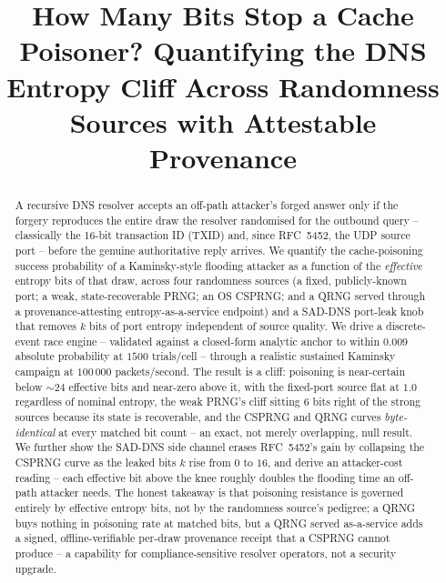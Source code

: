 \documentclass[conference]{IEEEtran}
\begin{document}
\title{How Many Bits Stop a Cache Poisoner? Quantifying the DNS Entropy Cliff Across Randomness Sources with Attestable Provenance}

\author{
}

\maketitle

\begin{abstract}
A recursive DNS resolver accepts an off-path attacker's forged answer only if the forgery reproduces
the entire draw the resolver randomised for the outbound query -- classically the 16-bit transaction ID
(TXID) and, since RFC~5452, the UDP source port -- before the genuine authoritative reply arrives. We
quantify the cache-poisoning success probability of a Kaminsky-style flooding attacker as a function of
the \emph{effective} entropy bits of that draw, across four randomness sources (a fixed, publicly-known
port; a weak, state-recoverable PRNG; an OS CSPRNG; and a QRNG served through a provenance-attesting
entropy-as-a-service endpoint) and a SAD-DNS port-leak knob that removes $k$ bits of port entropy
independent of source quality. We drive a discrete-event race engine -- validated against a closed-form
analytic anchor to within $0.009$ absolute probability at $1500$ trials/cell -- through a realistic
sustained Kaminsky campaign at $100\,000$ packets/second. The result is a cliff: poisoning is
near-certain below $\sim\!24$ effective bits and near-zero above it, with the fixed-port source flat at
$1.0$ regardless of nominal entropy, the weak PRNG's cliff sitting $6$ bits right of the strong sources
because its state is recoverable, and the CSPRNG and QRNG curves \emph{byte-identical} at every matched
bit count -- an exact, not merely overlapping, null result. We further show the SAD-DNS side channel
erases RFC~5452's gain by collapsing the CSPRNG curve as the leaked bits $k$ rise from $0$ to $16$, and
derive an attacker-cost reading -- each effective bit above the knee roughly doubles the flooding time an
off-path attacker needs. The honest takeaway is that poisoning resistance is governed entirely by
effective entropy bits, not by the randomness source's pedigree; a QRNG buys nothing in poisoning rate at
matched bits, but a QRNG served as-a-service adds a signed, offline-verifiable per-draw provenance receipt
that a CSPRNG cannot produce -- a capability for compliance-sensitive resolver operators, not a security
upgrade.
\end{abstract}
\end{document}
